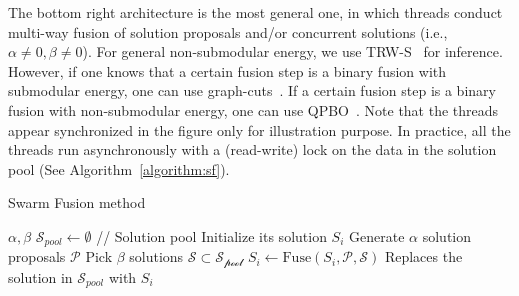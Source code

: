 %
The bottom right architecture is the most general one, in which threads
conduct multi-way fusion of solution proposals and/or concurrent
solutions (i.e., $\alpha\ne 0, \beta \ne 0$).
%
For general non-submodular energy, we use TRW-S~\cite{TRW-S, opengm} for inference.
%
However, if one knows that a certain fusion step is a binary fusion with
submodular energy, one can use
graph-cuts~\cite{alpha_expansion}. If a certain fusion step is a
binary fusion with non-submodular energy, one can use
QPBO~\cite{second_order_stereo}.
%
Note that the threads appear synchronized in the figure only for
illustration purpose. In practice, all the threads run asynchronously
with a (read-write) lock on the data in the solution pool (See
Algorithm~\ref{algorithm:sf}).
%
%
%
\begin{algorithm}
 \caption{Swarm Fusion method}
 \label{algorithm:sf}
 \begin{algorithmic}
  \Procedure{} {$\alpha, \beta$}
  \State $\mathcal{S}_{pool} \leftarrow \emptyset$ //
  Solution pool
  \State Initialize its solution $S_i$
  \EndFor
  \State
  \State Generate $\alpha$ solution proposals $\mathcal{P}$ %
  \State Pick $\beta$ solutions $\mathcal{S} \subset \mathcal{S_{\mbox{pool}}}$
  \State $S_i \leftarrow \mbox{Fuse}(S_i, \mathcal{P}, \mathcal{S})$
  \State Replaces the solution in $\mathcal{S}_{pool}$ with $S_i$
  \EndFor
  \EndProcedure
 \end{algorithmic}
\end{algorithm}



